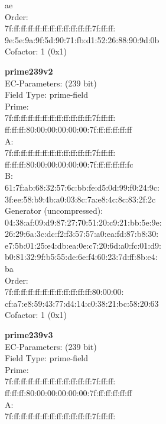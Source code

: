     ae\\
Order: \\
    7f:ff:ff:ff:ff:ff:ff:ff:ff:ff:ff:ff:7f:ff:ff:\\
    9e:5e:9a:9f:5d:90:71:fb:d1:52:26:88:90:9d:0b\\
Cofactor:  1 (0x1)\\
\item \textbf{ prime239v2 }\\
EC-Parameters: (239 bit)\\
Field Type: prime-field\\
Prime:\\
    7f:ff:ff:ff:ff:ff:ff:ff:ff:ff:ff:ff:7f:ff:ff:\\
    ff:ff:ff:80:00:00:00:00:00:7f:ff:ff:ff:ff:ff\\
A:   \\
    7f:ff:ff:ff:ff:ff:ff:ff:ff:ff:ff:ff:7f:ff:ff:\\
    ff:ff:ff:80:00:00:00:00:00:7f:ff:ff:ff:ff:fc\\
B:   \\
    61:7f:ab:68:32:57:6c:bb:fe:d5:0d:99:f0:24:9c:\\
    3f:ee:58:b9:4b:a0:03:8c:7a:e8:4c:8c:83:2f:2c\\
Generator (uncompressed):\\
    04:38:af:09:d9:87:27:70:51:20:c9:21:bb:5e:9e:\\
    26:29:6a:3c:dc:f2:f3:57:57:a0:ea:fd:87:b8:30:\\
    e7:5b:01:25:e4:db:ea:0e:c7:20:6d:a0:fc:01:d9:\\
    b0:81:32:9f:b5:55:de:6e:f4:60:23:7d:ff:8b:e4:\\
    ba\\
Order: \\
    7f:ff:ff:ff:ff:ff:ff:ff:ff:ff:ff:ff:80:00:00:\\
    cf:a7:e8:59:43:77:d4:14:c0:38:21:bc:58:20:63\\
Cofactor:  1 (0x1)\\
\item \textbf{ prime239v3 }\\
EC-Parameters: (239 bit)\\
Field Type: prime-field\\
Prime:\\
    7f:ff:ff:ff:ff:ff:ff:ff:ff:ff:ff:ff:7f:ff:ff:\\
    ff:ff:ff:80:00:00:00:00:00:7f:ff:ff:ff:ff:ff\\
A:   \\
    7f:ff:ff:ff:ff:ff:ff:ff:ff:ff:ff:ff:7f:ff:ff:\\
